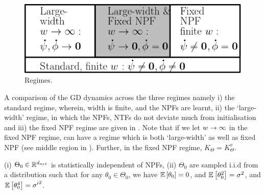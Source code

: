 \begin{figure}
\includegraphics[scale=0.25]{figs/regime.png}
\caption{\label{fig:regime} Regimes.}
\end{figure}
A comparison of the GD dynamics across the three regimes namely i) the standard regime, wherein, width is finite, and the NPFs are learnt, ii) the `large-width' regime, in which the NPFs, NTFs do not deviate much from initialisation and iii) the fixed NPF regime are given in . Note that if we let $w\rightarrow\infty$ in the fixed NPF regime, can have a regime which is both `large-width' as well as fixed NPF (see middle region in ). Further, in the fixed NPF regime, $K_{\Theta}=K^v_{\Theta}$.
\FloatBarrier
\begin{table}[h]\centering
{}
\caption{Dynamics in various regimes. Here $p\in[P], s\in[n]$.}
\label{tb:dynamics}
\end{table}
\begin{assumption}\label{assmp:main}
(i) $\Theta_0\in\mathbb{R}^{d_{net}}$ is statistically independent of NPFs, (ii) $\Theta_0$ are sampled i.i.d from a distribution such that for any $\theta_0\in\Theta_0$,  we have $\mathbb{E}\left[\theta_0\right]=0$, and  $\mathbb{E}\left[\theta^2_0\right]=\sigma^2$, and $\mathbb{E}\left[\theta^4_0\right]={\sigma'}^2$.
\end{assumption}
